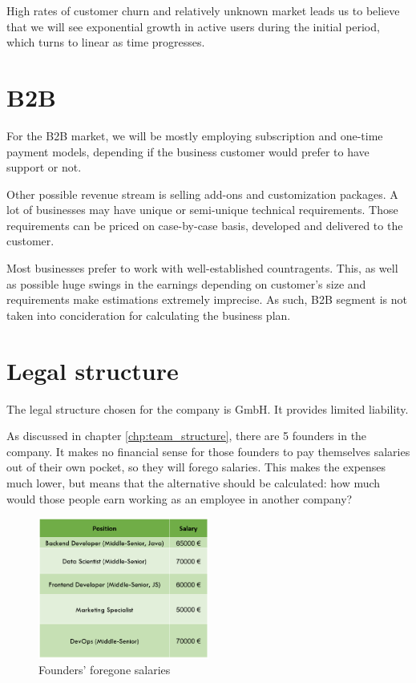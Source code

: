 High rates of customer churn and relatively unknown market leads us to believe that we will see exponential growth in active users during the initial period, which turns to linear as time progresses.

\section{B2B}
For the B2B market, we will be mostly employing subscription and one-time payment models, depending if the business customer would prefer to have support or not.

Other possible revenue stream is selling add-ons and customization packages. A lot of businesses may have unique or semi-unique technical requirements. Those requirements can be priced on case-by-case basis, developed and delivered to the customer.

Most businesses prefer to work with well-established countragents. This, as well as possible huge swings in the earnings depending on customer's size and requirements make estimations extremely imprecise. As such, B2B segment is not taken into concideration for calculating the business plan.

\section{Legal structure}

The legal structure chosen for the company is GmbH. It provides limited liability.

As discussed in chapter \ref{chp:team_structure}, there are 5 founders in the company. It makes no financial sense for those founders to pay themselves salaries out of their own pocket, so they will forego salaries. This makes the expenses much lower, but means that the alternative should be calculated: how much would those people earn working as an employee in another company?

\begin{figure}[H]
    \centering
    \includegraphics[width=0.5\textwidth]{figures/founder_salaries.png}
    \caption{Founders' foregone salaries}
    \label{fig:founder_salaries}
\end{figure}

